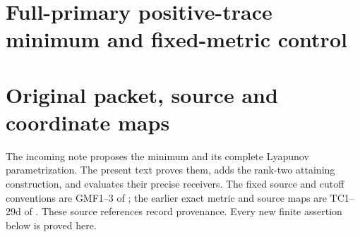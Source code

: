 \documentclass[11pt,a4paper]{article}
\providecommand{\rank}{\operatorname{rank}}
\providecommand{\diag}{\operatorname{diag}}
\providecommand{\Tr}{\operatorname{Tr}}
\providecommand{\PP}{\mathcal P}
\providecommand{\norm}[1]{\left\lVert#1\right\rVert}
\begin{document}
\endgroup

\clearpage
\begingroup
\def\C{\mathbb C}
\def\R{\mathbb R}
\def\PP{\mathcal P}
\def\norm#1{\left\lVert#1\right\rVert}
\def\Tr{\operatorname{Tr}}
\def\rank{\operatorname{rank}}
\def\im{\operatorname{im}}
\def\diag{\operatorname{diag}}
\def\spec{\operatorname{spec}}

\setcounter{equation}{0}
\renewcommand{\theequation}{A03PT.\arabic{equation}}
\section*{Full-primary positive-trace minimum and fixed-metric control}



\begin{abstract}
For the unchanged arithmetic multiplication packet, the minimum of the
positive Hermitian weight trace over all positive metrics is evaluated,
attained, and its entire minimizing set is parametrized by finite
Lyapunov sums. All primary jets and all same-half cross terms are
retained. A rank-one observable forcing on each complete spectral half
constructs an attaining metric whose weight has precisely two nonzero
eigenvalues. The canonical attained polynomial metric is then evaluated
through its actual boundary rows: its exact rank-two scalar exceeds the
minimum by an explicit positive spectral-projection expression. The
positive-primary determinant line has exactly the same growth exponent
for every metric. Finally an original finite polynomial section realizes
every minimizing metric up to a specified scalar, and its complete
residual in each smaller polynomial source quotient is computed.
\end{abstract}

\section{Original packet, source and coordinate maps}

The incoming note \cite{a03pt:incoming} proposes the minimum and its complete
Lyapunov parametrization. The present text proves them, adds the
rank-two attaining construction, and evaluates their precise receivers.
The fixed source and cutoff conventions are GMF1--3 of
\cite{a03pt:gmf}; the earlier exact metric and source maps are TC1--29d of
\cite{a03pt:tc}. These source references record provenance. Every new finite
assertion below is proved here.
\end{document}
